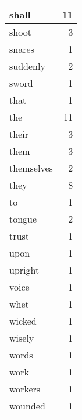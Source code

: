\begin{center}
\begin{longtable}{l|r}
shall & 11 \\ \hline
shoot & 3 \\ \hline
snares & 1 \\ \hline
suddenly & 2 \\ \hline
sword & 1 \\ \hline
that & 1 \\ \hline
the & 11 \\ \hline
their & 3 \\ \hline
them & 3 \\ \hline
themselves & 2 \\ \hline
they & 8 \\ \hline
to & 1 \\ \hline
tongue & 2 \\ \hline
trust & 1 \\ \hline
upon & 1 \\ \hline
upright & 1 \\ \hline
voice & 1 \\ \hline
whet & 1 \\ \hline
wicked & 1 \\ \hline
wisely & 1 \\ \hline
words & 1 \\ \hline
work & 1 \\ \hline
workers & 1 \\ \hline
wounded & 1 \\ \hline
\end{longtable}
\end{center}



\normalsize



